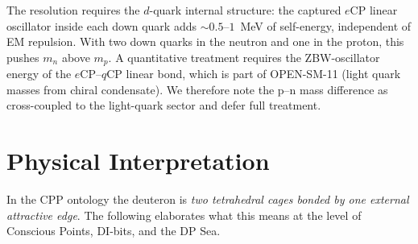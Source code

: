 \documentclass[11pt,letterpaper]{article}
\begin{document}
The resolution requires the $d$-quark internal structure: the captured $e\mathrm{CP}$ linear oscillator inside each down quark adds $\sim 0.5$--$1$~MeV of self-energy, independent of EM repulsion. With two down quarks in the neutron and one in the proton, this pushes $m_n$ above $m_p$. A quantitative treatment requires the ZBW-oscillator energy of the $e\mathrm{CP}$--$q\mathrm{CP}$ linear bond, which is part of OPEN-SM-11 (light quark masses from chiral condensate). We therefore note the p--n mass difference as cross-coupled to the light-quark sector and defer full treatment.

\section{Physical Interpretation}
\label{sec:interpretation}

In the CPP ontology the deuteron is \emph{two tetrahedral cages bonded by one external attractive edge}. The following elaborates what this means at the level of Conscious Points, DI-bits, and the DP Sea.
\end{document}
